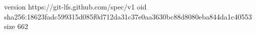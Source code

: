 version https://git-lfs.github.com/spec/v1
oid sha256:18623fadc599315d085f0d712da31c37e0aa3630bc88d8080eba844da1c40553
size 662
